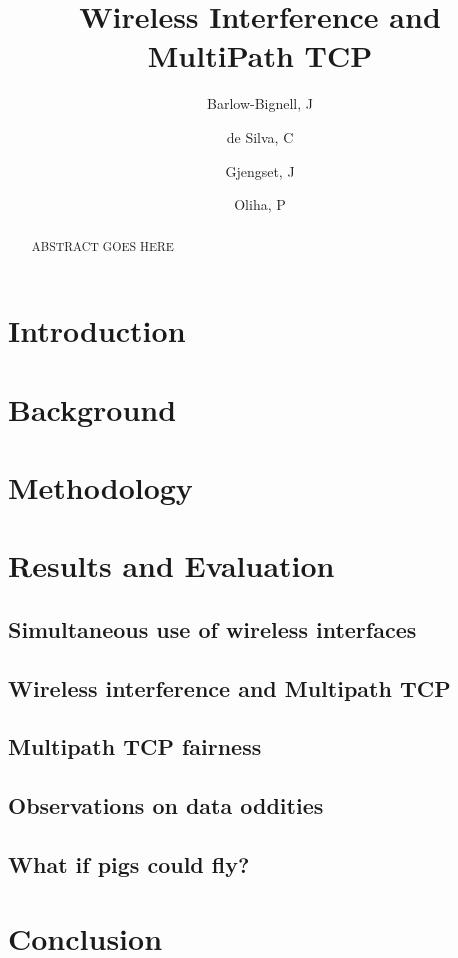 \documentclass[12pt,a4paper]{article}
\title{Wireless Interference and MultiPath TCP}
\author{Barlow-Bignell, J}
\author{de Silva, C}
\author{Gjengset, J}
\author{Oliha, P}
\affil{University College London}
\date{}
\begin{document}
\maketitle

\begin{abstract}
  ABSTRACT GOES HERE
\end{abstract}
\clearpage

\section{Introduction}


\section{Background}


\section{Methodology}


\section{Results and Evaluation}
\subsection{Simultaneous use of wireless interfaces}

\subsection{Wireless interference and Multipath TCP}

\subsection{Multipath TCP fairness}

\subsection{Observations on data oddities}


\subsection{What if pigs could fly?} %

\section{Conclusion}

%
\end{document}
